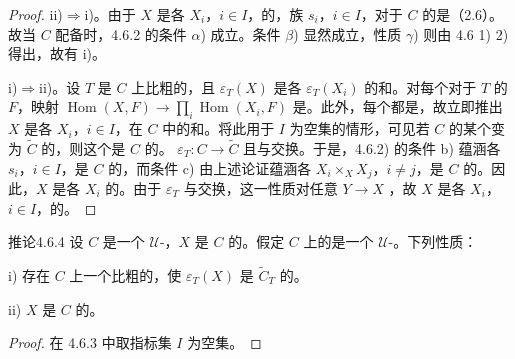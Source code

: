 \begin{proof}
ii)$\Rightarrow$i)。由于 $X$ 是各 $X_i$，$i\in I$，的，族 $s_i$，$i\in I$，对于 $C$ 的是（2.6）。故当 $C$ 配备时，4.6.2 的条件 $\alpha$) 成立。条件 $\beta$) 显然成立，性质 $\gamma$) 则由 4.6 1) 2) 得出，故有 i)。

i)$\Rightarrow$ii)。设 $T$ 是 $C$ 上比粗的，且 $\varepsilon_T(X)$ 是各 $\varepsilon_T(X_i)$ 的和。对每个对于 $T$ 的 $F$，映射 $\operatorname{Hom}(X,F)\to\prod_i\operatorname{Hom}(X_i,F)$ 是。此外，每个都是，故立即推出 $X$ 是各 $X_i$，$i\in I$，在 $C$ 中的和。将此用于 $I$ 为空集的情形，可见若 $C$ 的某个变为 $\widetilde C$ 的，则这个是 $C$ 的。 $\varepsilon_T:C\to\widetilde C$ 且与交换。于是，4.6.2) 的条件 b) 蕴涵各 $s_i$，$i\in I$，是 $C$ 的，而条件 c) 由上述论证蕴涵各 $X_i\times_XX_j$，$i\ne j$，是 $C$ 的。因此，$X$ 是各 $X_i$ 的。由于 $\varepsilon_T$ 与交换，这一性质对任意 $Y\to X$ ，故 $X$ 是各 $X_i$，$i\in I$，的。
\end{proof}
\begin{SGAresult}{推论}{4.6.4}
设 $C$ 是一个 $\mathcal U$-，$X$ 是 $C$ 的。假定 $C$ 上的是一个 $\mathcal U$-。下列性质：
\par i) 存在 $C$ 上一个比粗的，使 $\varepsilon_T(X)$ 是 $\widetilde C_T$ 的。
\par ii) $X$ 是 $C$ 的。
\end{SGAresult}
\begin{proof}在 4.6.3 中取指标集 $I$ 为空集。\end{proof}
